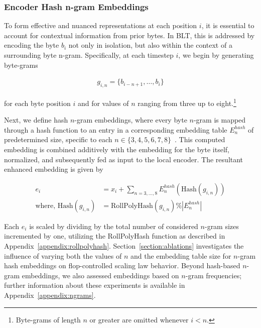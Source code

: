 \subsubsection{Encoder Hash n-gram Embeddings}
\label{sec:ngram-emb}
\label{sec:hash-emb}
To form effective and nuanced representations at each position $i$, it is essential to account for contextual information from prior bytes. In {\textsc BLT}, this is addressed by encoding the byte $b_i$ not only in isolation, but also within the context of a surrounding byte n-gram. Specifically, at each timestep $i$, we begin by generating byte-grams

\begin{align}
    g_{i,n}=\{b_{i-n + 1},\ldots, b_i\}
\end{align}

for each byte position $i$ and for values of $n$ ranging from three up to eight.\footnote{
Byte-grams of length $n$ or greater are omitted whenever $i < n$. }

Next, we define hash $n$-gram embeddings, where every byte $n$-gram is mapped through a hash function to an entry in a corresponding embedding table $E_{n}^{hash}$ of predetermined size, specific to each $n \in\{3,4,5,6,7,8\}$~\citep{bai2010learning}.
This computed embedding is combined additively with the embedding for the byte itself, normalized, and subsequently fed as input to the local encoder. The resultant enhanced embedding is given by

\begin{align}
e_i &= x_i + \sum_{n = 3,...,8}E_{n}^{hash}(\text{Hash}(g_{i,n})) \\
\text{where, Hash}(g_{i,n}) &= \text{RollPolyHash}(g_{i,n}) \% |E_{n}^{hash}|
\end{align}

Each $e_i$ is scaled by dividing by the total number of considered $n$-gram sizes incremented by one, utilizing the RollPolyHash function as described in Appendix~\ref{appendix:rollpolyhash}. Section~\ref{section:ablations} investigates the influence of varying both the values of $n$ and the embedding table size for $n$-gram hash embeddings on flop-controlled scaling law behavior. Beyond hash-based $n$-gram embeddings, we also assessed embeddings based on $n$-gram frequencies; further information about these experiments is available in Appendix~\ref{appendix:ngrams}.

